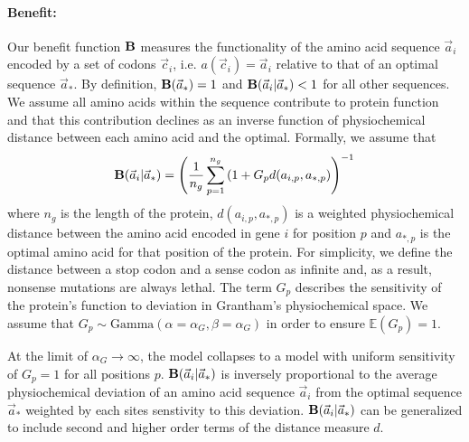 \documentclass{article}
\newcommand{\EE}{\mathbb{E}} %
\newcommand{\Funcaoptvec}{\ensuremath{\Func(\aoptvec)}\xspace}
\newcommand{\Funcaveci}{\ensuremath{\Func(\aveci|\aoptvec)}\xspace}
\newcommand{\Func}{\ensuremath{\text{\textbf{B}}}\xspace}
\newcommand{\aip}{\ensuremath{a_{i,p}}\xspace}
\newcommand{\alphag}{\ensuremath{\alpha_G}\xspace}
\newcommand{\aoptp}{\ensuremath{a_{*,p}}\xspace}
\newcommand{\aoptvec}{\ensuremath{\Vec{a}_*}\xspace}
\newcommand{\aveci}{\ensuremath{\Vec{a}_i}\xspace}
\newcommand{\cveci}{\ensuremath{\cvec_i}\xspace}
\newcommand{\cvec}{\ensuremath{\Vec{c}}\xspace}
\renewcommand{\ng}{\ensuremath{{n_g}}\xspace}
\newcommand{\gp}{\ensuremath{{G_p}}\xspace}
\begin{document}
\paragraph*{Benefit: }
Our benefit function \Func measures the functionality of the amino acid sequence \aveci encoded by a set of codons \cveci, i.e. $a(\cveci) = \aveci$ relative to that of an optimal sequence $\aoptvec$.
By definition, $\Funcaoptvec = 1$ and $\Funcaveci < 1$ for all other sequences.
We assume all amino acids within the sequence contribute to protein function and that this contribution declines as an inverse function of physiochemical distance between each amino acid and the optimal.
Formally, we assume that
\begin{equation}
\Funcaveci = \left(\frac{1}{\ng} \sum_{p=1}^\ng \left(1 + \gp d(\aip, \aoptp\right)\right)^{-1}
\end{equation}
where $\ng$ is the length of the protein, $d(\aip, \aoptp)$ is a weighted physiochemical distance between the amino acid encoded in gene $i$ for position $p$ and $\aoptp$ is the optimal amino acid for that position of the protein.
For simplicity, we define the distance between a stop codon and a sense codon as infinite and, as a result, nonsense mutations are always lethal.
The term \gp describes the sensitivity of the protein's function to deviation in Grantham's physiochemical space.
We assume that $\gp \sim \text{Gamma}\left(\alpha = \alphag, \beta = \alphag\right)$ in order to ensure $\EE(\gp) = 1$.

At the limit of $\alphag \rightarrow \infty$, the model collapses to a model with uniform sensitivity of $\gp = 1$ for all positions $p$.
\Funcaveci is inversely proportional to the average physiochemical deviation of an amino acid sequence \aveci from the optimal sequence \aoptvec weighted by each sites senstivity to this deviation.
\Funcaveci can be generalized to include second and higher order terms of the distance measure $d$.
\end{document}
